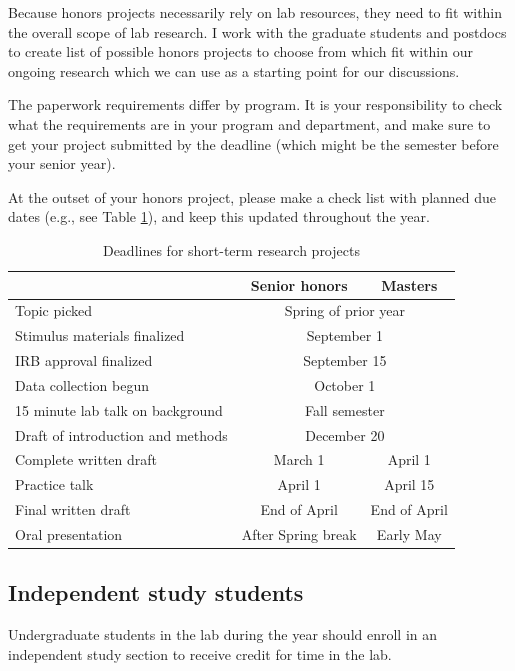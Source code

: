 \documentclass[letterpaper,12pt,oneside]{memoir}
\begin{document}
Because honors projects necessarily rely on lab resources, they need to fit within the overall scope of lab research. I work with the graduate students and postdocs to create list of possible honors projects to choose from which fit within our ongoing research which we can use as a starting point for our discussions.

The paperwork requirements differ by program. It is your responsibility to check what the requirements are in your program and department, and make sure to get your project submitted by the deadline (which might be the semester before your senior year).

At the outset of your honors project, please make a check list with planned due dates (e.g., see Table \ref{table:deadlines}), and keep this updated throughout the year.

\begin{table}
\centering
\caption{Deadlines for short-term research projects}
\begin{tabular}{lcc}
\toprule
& Senior honors & Masters\\
\midrule
Topic picked& \multicolumn{2}{c}{Spring of prior year}\\
Stimulus materials finalized& \multicolumn{2}{c}{September 1}\\
IRB approval finalized& \multicolumn{2}{c}{September 15}\\
Data collection begun& \multicolumn{2}{c}{October 1}\\
15 minute lab talk on background& \multicolumn{2}{c}{Fall semester}\\
Draft of introduction and methods& \multicolumn{2}{c}{December 20}\\
Complete written draft& March 1& April 1\\
Practice talk& April 1 & April 15\\
Final written draft& End of April & End of April\\
Oral presentation& After Spring break & Early May\\
\bottomrule
\end{tabular}
\label{table:deadlines}
\end{table}

\subsection{Independent study students}
Undergraduate students in the lab during the year should enroll in an independent study section to receive credit for time in the lab.
\end{document}
